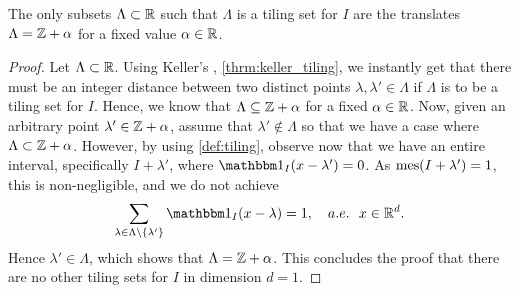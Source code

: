 \documentclass[../thesis.tex]{subfiles}
\begin{document}
\begin{lemma}\label{lem:tiling_unit_1d}
    The only subsets $\Lambda \subset \mathbb{R}$ such that $\Lambda$ is a tiling set for $I$ are the translates $\Lambda = \mathbb{Z} +\alpha$ for a fixed value $\alpha\in \mathbb{R}$. 
\end{lemma}

\begin{proof}  %
    Let $\Lambda \subset \mathbb{R}$. Using Keller's , \cref{thrm:keller_tiling}, we instantly get that there must be an integer distance between two distinct points $\lambda,\lambda' \in \Lambda$ if $\Lambda$ is to be a tiling set for $I$. Hence, we know that $\Lambda \subseteq \mathbb{Z} +\alpha$ for a fixed $\alpha\in \mathbb{R}$. Now, given an arbitrary point $\lambda' \in \mathbb{Z} +\alpha$, assume that $\lambda'\notin \Lambda$ so that we have a case where $\Lambda \subset \mathbb{Z}+\alpha$. However, by using \cref{def:tiling}, observe now that we have an entire interval, specifically $I+\lambda'$, where $\indicator{I}{x - \lambda'} = 0$. As $\operatorname{mes}(I+\lambda') = 1 $, this is non-negligible, and we do not achieve
    \begin{equation*}
        \sum_{\lambda \in \Lambda\setminus \braq{\lambda'}} \indicator{I}{x-\lambda} = 1, \quad a.e. \text{\space\space} x \in \R^d.
    \end{equation*}
    Hence $\lambda' \in \Lambda$, which shows that $\Lambda = \mathbb{Z}+\alpha$. This concludes the proof that there are no other tiling sets for $I$ in dimension $d=1$. %
\end{proof}
\end{document}
